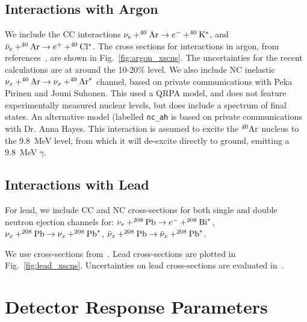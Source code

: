 \documentclass[12pt]{article}
\begin{document}
\subsection{Interactions with Argon}

We include the CC interactions
$\nu_e + ^{40}{\rm Ar} \rightarrow e^- + ^{40}{\rm K^*}$, and
$\bar{\nu}_e + ^{40}{\rm Ar} \rightarrow e^+ + ^{40}{\rm Cl^*}$.
The cross sections for interactions in argon, from references~\cite{GilBotella:2004bv,Kolbe:2003ys},
are shown in Fig.~\ref{fig:argon_xscns}.   The uncertainties for the recent calculations
are at around the 10-20\% level.
We also include NC inelastic
$\nu_x + ^{40}{\rm Ar} \rightarrow \nu_x+ ^{40}{\rm Ar}^*$ channel, based on private communications with
Peka Pirinen and Jouni Suhonen.  This used a QRPA model, and does not feature 
experimentally measured nuclear levels, but does include a spectrum of final states.  
An alternative model (labelled \texttt{nc\_ah} is based on private
communications with Dr. Anna Hayes.  This interaction is assumed to excite the $^{40}{\rm Ar}$
nucleus to the 9.8~MeV level, from which it will de-excite directly to ground, emitting a 9.8~MeV $\gamma$.


\subsection{Interactions with Lead}

For lead, we include
CC and NC cross-sections for both single and double
neutron ejection channels for:
$\nu_e + ^{208}{\rm Pb} \rightarrow e^- + ^{208}{\rm Bi}^{*}$,
$\nu_x + ^{208}{\rm Pb} \rightarrow \nu_x + ^{208}{\rm Pb}^{*}$,
$\bar{\nu}_x + ^{208}{\rm Pb} \rightarrow \bar{\nu}_x + ^{208}{\rm Pb}^{*}$.

We use cross-sections from~\cite{Engel:2002hg}.
Lead cross-sections are plotted in Fig.~\ref{fig:lead_xscns}.  Uncertainties on lead cross-sections are evaluated in~\cite{Paar:2011pz}.

\section{Detector Response Parameters}\label{response}
\end{document}
